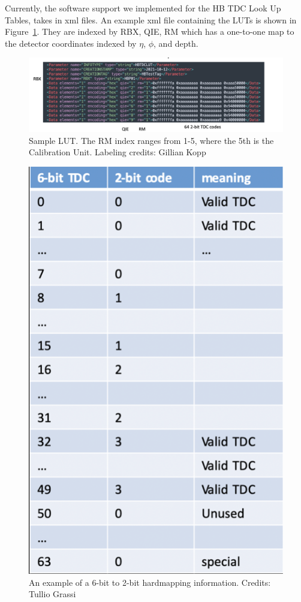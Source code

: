 Currently, the software support we implemented for the HB TDC Look Up Tables, takes in xml files. An example xml file containing the LUTs is shown in  Figure~\ref{fig:XMLFile}. They are indexed by RBX, QIE, RM which has a one-to-one map to the detector coordinates indexed by $\eta$, $\phi$, and depth. 

\begin{figure}[tbp!]
\begin{center}
\includegraphics[scale=0.6]{fig/ExampleLUT.png}
\end{center}
\caption{Sample LUT. The RM index ranges from 1-5, where the 5th is the Calibration Unit. Labeling credits: Gillian Kopp}
\label{fig:XMLFile}
\end{figure}

\begin{figure}[tbp!]
\begin{center}
\includegraphics[scale=0.6]{fig/6bitTo2bitMap.png}
\end{center}
\caption{An example of a 6-bit to 2-bit hardmapping information. Credits: Tullio Grassi}
\label{fig:bitMapping}
\end{figure}

